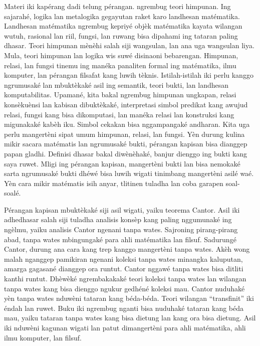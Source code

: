 Materi iki kapérang dadi telung pérangan. 
ngrembug teori himpunan. Ing sajarahé, logika lan metalogika gegayutan
raket karo landhesan matématika. Landhesan matématika ngrembug kepriyé
objèk matématika kayata wilangan wutuh, rasional lan riil, fungsi, lan
ruwang bisa dipahami ing tataran paling dhasar. Teori himpunan mènèhi
salah siji wangsulan, lan ana uga wangsulan liya. Mula, teori
himpunan lan logika wis suwé disinaoni bebarengan. Himpunan, relasi,
lan fungsi tinemu ing manéka panaliten formal ing matématika, ilmu
komputer, lan pérangan filsafat kang luwih tèknis. Istilah-istilah iki
perlu kanggo ngrumusaké lan mbuktèkaké asil ing semantik, teori bukti,
lan landhesan komputabilitas. Upamané, kita bakal ngrembug himpunan
ungkapan, relasi konsèkuènsi lan kabisan dibuktèkaké, interpretasi
simbol predikat kang awujud relasi, fungsi kang bisa dikomputasi, lan
manéka relasi lan konstruksi kang migunakaké kabèh iku. Simbol
cekakan bisa nggampangaké andharan. Kita uga perlu mangertèni sipat
umum himpunan, relasi, lan fungsi. Yèn durung kulina mikir sacara
matématis lan ngrumusaké bukti, pérangan kapisan bisa dianggep
papan gladhi. Definisi dhasar bakal diwènèhaké, banjur dienggo ing
bukti kang saya ruwet. Mligi ing pérangan kapisan, mangertèni bukti
lan bisa nemokaké sarta ngrumusaké bukti dhéwé bisa luwih wigati
tinimbang mangertèni asilé waé. Yèn cara mikir matématis isih anyar,
tlitinen tuladha lan coba garapen soal-soalé.

Pérangan kapisan mbuktèkaké siji asil wigati, yaiku teorema Cantor.
Asil iki adhedhasar salah siji tuladha analisis konsèp kang paling
nggumunaké ing ngèlmu, yaiku analisis Cantor ngenani tanpa wates.
Sajroning pirang-pirang abad, tanpa wates mbingungaké para ahli
matématika lan filsuf. Sadurungé Cantor, durung ana cara kang trep
kanggo mangertèni tanpa wates. Akèh wong malah nganggep pamikiran
ngenani koleksi tanpa wates minangka kaluputan, amarga gagasané
dianggep ora runtut. Cantor nggawé tanpa wates bisa ditliti kanthi
runtut. Dhèwèké ngrembakakaké teori koleksi tanpa wates lan wilangan
tanpa wates kang bisa dienggo ngukur gedhéné koleksi mau. Cantor
nuduhaké yèn tanpa wates nduwèni tataran kang béda-béda. Teori
wilangan “transfinit” iki éndah lan ruwet. Buku iki ngrembug nganti
bisa nuduhaké tataran kang béda mau, yaiku tataran tanpa wates kang
bisa dietung lan kang ora bisa dietung. Asil iki nduwèni kagunan
wigati lan patut dimangertèni para ahli matématika, ahli ilmu
komputer, lan filsuf.

